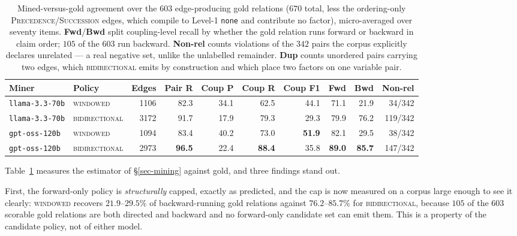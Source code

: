\begin{table}[t]
\centering\small
\caption{Mined-versus-gold agreement over the $603$ edge-producing gold relations
  ($670$ total, less the ordering-only \textsc{Precedence}/\textsc{Succession} edges, which
  compile to Level-1 \texttt{none} and contribute no factor), micro-averaged over seventy items.
  \textbf{Fwd}/\textbf{Bwd} split coupling-level recall by whether the gold relation runs forward
  or backward in claim order; $105$ of the $603$ run backward. \textbf{Non-rel} counts violations
  of the $342$ pairs the corpus explicitly declares unrelated --- a real negative set, unlike the
  unlabelled remainder. \textbf{Dup} counts unordered pairs carrying two edges, which
  \textsc{bidirectional} emits by construction and which place two factors on one variable pair.}
\label{tab:mining}
\begin{tabular}{@{}llrrrrrrrr@{}}
\toprule
Miner & Policy & Edges & Pair R & Coup P & Coup R & Coup F1 & Fwd & Bwd & Non-rel \\
\midrule
\texttt{llama-3.3-70b} & \textsc{windowed}      & 1106 & 82.3 & 34.1 & 62.5 & 44.1 & 71.1 & 21.9 & 34/342 \\
\texttt{llama-3.3-70b} & \textsc{bidirectional} & 3172 & 91.7 & 17.9 & 79.3 & 29.3 & 79.9 & 76.2 & 119/342 \\
\texttt{gpt-oss-120b}  & \textsc{windowed}      & 1094 & 83.4 & 40.2 & 73.0 & \textbf{51.9} & 82.1 & 29.5 & 38/342 \\
\texttt{gpt-oss-120b}  & \textsc{bidirectional} & 2973 & \textbf{96.5} & 22.4 & \textbf{88.4} & 35.8 & \textbf{89.0} & \textbf{85.7} & 147/342 \\
\bottomrule
\end{tabular}
\end{table}

Table~\ref{tab:mining} measures the estimator of \S\ref{sec-mining} against gold, and three findings
stand out.

First, the forward-only policy is \emph{structurally} capped, exactly as predicted, and the cap is
now measured on a corpus large enough to see it clearly: \textsc{windowed} recovers $21.9$--$29.5\%$
of backward-running gold relations against $76.2$--$85.7\%$ for \textsc{bidirectional}, because $105$
of the $603$ scorable gold relations are both directed and backward and no forward-only candidate set
can emit them. This is a property of the candidate policy, not of either model.

